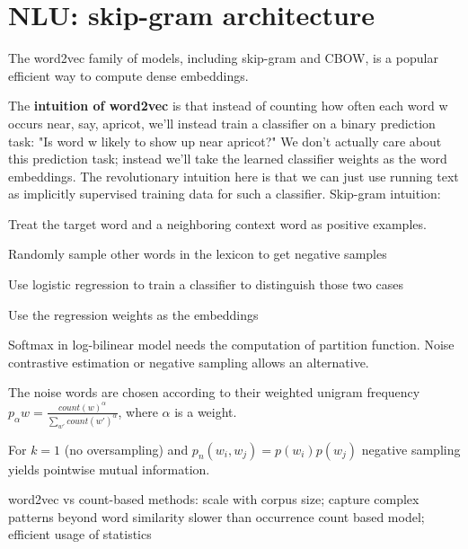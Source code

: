 \documentclass[12pt]{article}
\begin{document}
\section{NLU: skip-gram architecture}
\par The word2vec family of models, including skip-gram and CBOW, is a popular efficient way to compute dense embeddings.
\par The \textbf{intuition of word2vec} is that instead of counting how often each word w occurs near, say, apricot, we'll instead train a classifier on a binary prediction task: "Is word w likely to show up near apricot?" We don't actually care about this prediction task; instead we'll take the learned classifier weights as the word embeddings. The revolutionary intuition here is that we can just use running text as implicitly supervised training data for such a classifier.
Skip-gram intuition:
\ulb
\item Treat the target word and a neighboring context word as positive examples.
\item Randomly sample other words in the lexicon to get negative samples
\item Use logistic regression to train a classifier to distinguish those two cases
\item Use the regression weights as the embeddings
\ule
\par Softmax in log-bilinear model needs the computation of partition function. Noise contrastive estimation or negative sampling allows an alternative.
\par The noise words are chosen according to their weighted unigram frequency $p_{\alpha}w = \frac{count(w)^{\alpha}}{\sum_{w'}count(w')^{\alpha}}$, where $\alpha$ is a weight.
\par For $k=1$ (no oversampling) and $p_n(w_i, w_j)=p(w_i)p(w_j)$ negative sampling yields pointwise mutual information.
\par word2vec vs count-based methods:
\ulb
\pro scale with corpus size; capture complex patterns beyond word similarity
\con slower than occurrence count based model; efficient usage of statistics
\ule
\end{document}
